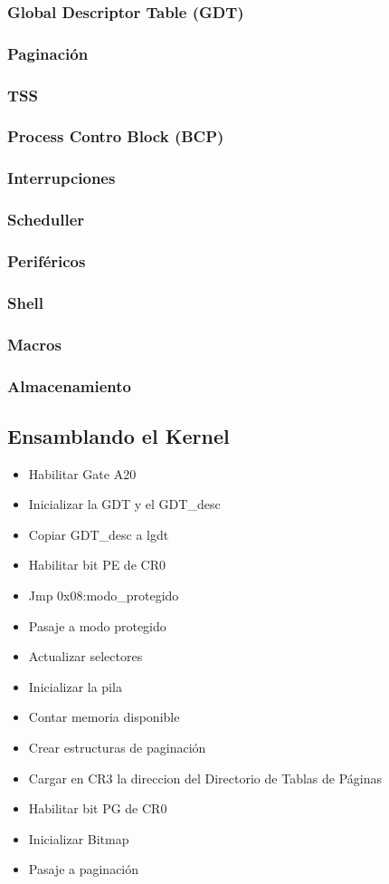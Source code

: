 \documentclass[11pt, a4paper]{article}
\begin{document}
		\subsubsection{Global Descriptor Table (GDT)}
		\subsubsection{Paginación}
		\subsubsection{TSS}
		\subsubsection{Process Contro Block (BCP) }
		\subsubsection{Interrupciones}
		\subsubsection{Scheduller}
		\subsubsection{Periféricos}
		\subsubsection{Shell}
		\subsubsection{Macros}
		\subsubsection{Almacenamiento}
	\subsection{Ensamblando el Kernel}
	\label{kernel}	
		\begin{itemize}
			\item Habilitar Gate A20
			\item Inicializar la GDT y el GDT\_desc
			\item Copiar GDT\_desc a lgdt
			\item Habilitar bit PE de CR0
			\item Jmp 0x08:modo\_protegido
			\item Pasaje a modo protegido
			\item Actualizar selectores
			\item Inicializar la pila
			\item Contar memoria disponible
			\item Crear estructuras de paginación
			\item Cargar en CR3 la direccion del Directorio de Tablas de Páginas
			\item Habilitar bit PG de CR0
			\item Inicializar Bitmap
			\item Pasaje a paginación
		\end{itemize}
	
\end{document}
